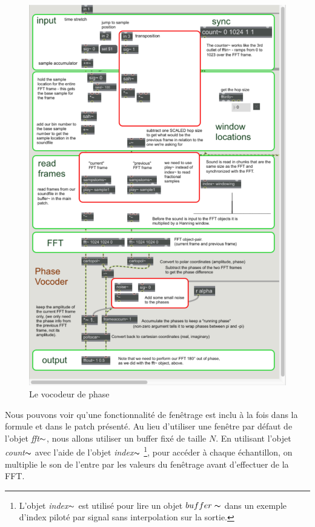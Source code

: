     \begin{figure}
        \centering
        \includegraphics[width = \textwidth]{Graphs/PhaseVocoder.png}
        \caption{Le vocodeur de phase}
        \label{Phasevocoder}
    \end{figure}
    
Nous pouvons voir qu'une fonctionnalité de fenêtrage est inclu à la fois dans la formule et dans le patch présenté. Au lieu d'utiliser une fenêtre par défaut de l'objet \textit{fft}$\thicksim $, nous allons utiliser un buffer fixé de taille $ N $. En utilisant l'objet \textit{count}$\thicksim $ avec l'aide de l'objet \textit{index}$\thicksim$ \footnote{L'objet \textit{index}$\thicksim $ est utilisé pour lire un objet $ buffer \thicksim $ dans un exemple d'index piloté par signal sans interpolation sur la sortie.}, pour accéder à chaque échantillon, on multiplie le son de l'entre par les valeurs du fenêtrage avant d'effectuer de la FFT.

